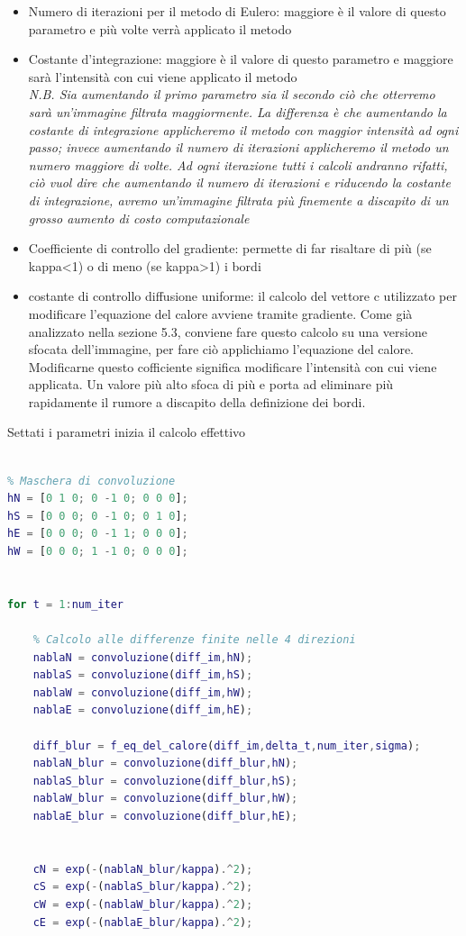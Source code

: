\begin{itemize}
    \item Numero di iterazioni per il metodo di Eulero: maggiore è il valore di questo parametro e più volte verrà applicato il metodo
    \item Costante d'integrazione: maggiore è il valore di questo parametro e maggiore sarà l'intensità con cui viene applicato il metodo\\
    \vspace{0.25em}
    \textit{N.B. Sia aumentando il primo parametro sia il secondo ciò che otterremo sarà un'immagine filtrata maggiormente. La differenza è che aumentando la costante di integrazione applicheremo il metodo con maggior intensità ad ogni passo; invece aumentando il numero di iterazioni applicheremo il metodo un numero maggiore di volte. 
    Ad ogni iterazione tutti i calcoli andranno rifatti, ciò vuol dire che aumentando il numero di iterazioni e riducendo la costante di integrazione, avremo un'immagine filtrata più finemente a discapito di un grosso aumento di costo computazionale}
    \item Coefficiente di controllo del gradiente: permette di far risaltare di più (se kappa<1) o di meno (se kappa>1) i bordi
    \item costante di controllo diffusione uniforme: il calcolo del vettore c utilizzato per modificare l'equazione del calore avviene tramite gradiente. Come già analizzato nella sezione 5.3, conviene fare questo calcolo su una versione sfocata dell'immagine, per fare ciò applichiamo l'equazione del calore. Modificarne questo cofficiente significa modificare l'intensità con cui viene applicata. Un valore più alto sfoca di più e porta ad eliminare più rapidamente il rumore a discapito della definizione dei bordi.
\end{itemize}
Settati i parametri inizia il calcolo effettivo
\begin{lstlisting}[language=MATLAB, name=listato]

% Maschera di convoluzione
hN = [0 1 0; 0 -1 0; 0 0 0];
hS = [0 0 0; 0 -1 0; 0 1 0];
hE = [0 0 0; 0 -1 1; 0 0 0];
hW = [0 0 0; 1 -1 0; 0 0 0];


for t = 1:num_iter
   
    % Calcolo alle differenze finite nelle 4 direzioni
    nablaN = convoluzione(diff_im,hN);
    nablaS = convoluzione(diff_im,hS);   
    nablaW = convoluzione(diff_im,hW);
    nablaE = convoluzione(diff_im,hE);
    
    diff_blur = f_eq_del_calore(diff_im,delta_t,num_iter,sigma);
    nablaN_blur = convoluzione(diff_blur,hN);
    nablaS_blur = convoluzione(diff_blur,hS);   
    nablaW_blur = convoluzione(diff_blur,hW);
    nablaE_blur = convoluzione(diff_blur,hE);


    cN = exp(-(nablaN_blur/kappa).^2);
    cS = exp(-(nablaS_blur/kappa).^2);
    cW = exp(-(nablaW_blur/kappa).^2);
    cE = exp(-(nablaE_blur/kappa).^2);
\end{lstlisting}
